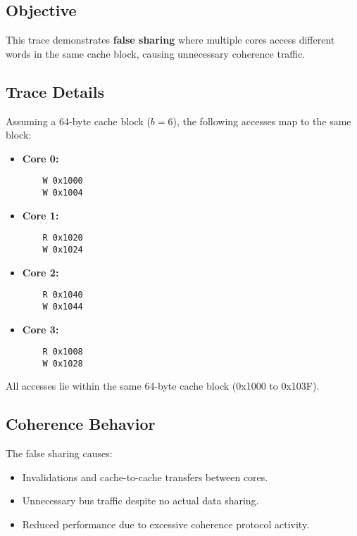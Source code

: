 \documentclass[a4paper,12pt]{article}
\begin{document}
\vspace{-5pt} %

\subsection*{Objective}
\vspace{-3pt}
This trace demonstrates \textbf{false sharing} where multiple cores access different words in the same cache block, causing unnecessary coherence traffic.

\vspace{5pt}
\subsection*{Trace Details}
\vspace{-3pt}
Assuming a 64-byte cache block ($b = 6$), the following accesses map to the same block:

\begin{itemize}[noitemsep]
    \item \textbf{Core 0:}
    \begin{verbatim}
    W 0x1000
    W 0x1004
    \end{verbatim}
    \item \textbf{Core 1:}
    \begin{verbatim}
    R 0x1020
    W 0x1024
    \end{verbatim}
    \item \textbf{Core 2:}
    \begin{verbatim}
    R 0x1040
    W 0x1044
    \end{verbatim}
    \item \textbf{Core 3:}
    \begin{verbatim}
    R 0x1008
    W 0x1028
    \end{verbatim}
\end{itemize}

\vspace{-5pt}
All accesses lie within the same 64-byte cache block (0x1000 to 0x103F).

\vspace{5pt}
\subsection*{Coherence Behavior}
\vspace{-3pt}
The false sharing causes:
\begin{itemize}[noitemsep]
    \item Invalidations and cache-to-cache transfers between cores.
    \item Unnecessary bus traffic despite no actual data sharing.
    \item Reduced performance due to excessive coherence protocol activity.
\end{itemize}
\end{document}
